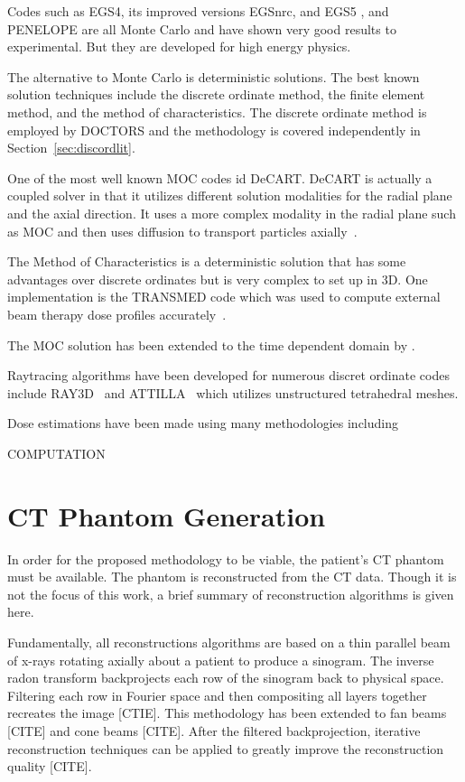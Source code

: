 Codes such as EGS4, its improved versions EGSnrc, and EGS5 \citep{ref:nelsonw}, and PENELOPE \citep{ref:salvatf} are all Monte Carlo and have shown very good results to experimental. But they are developed for high energy physics.

The alternative to Monte Carlo is deterministic solutions. The best known solution techniques include the discrete ordinate method, the finite element method, and the method of characteristics. The discrete ordinate method is employed by DOCTORS and the methodology is covered independently in Section~\ref{sec:discordlit}.

One of the most well known MOC codes id DeCART. DeCART is actually a coupled solver in that it utilizes different solution modalities for the radial plane and the axial direction. It uses a more complex modality in the radial plane such as MOC and then uses diffusion to transport particles axially~\citep{ref:hursinm}.

The Method of Characteristics is a deterministic solution that has some advantages over discrete ordinates but is very complex to set up in 3D. One implementation is the TRANSMED code which was used to compute external beam therapy dose profiles accurately~\citep{ref:williamsm}.

The MOC solution has been extended to the time dependent domain by \citet{ref:hoffmana}.

Raytracing algorithms have been developed for numerous discret ordinate codes include RAY3D~\citep{ref:yingz} and ATTILLA~\citep{ref:wareingt} which utilizes unstructured tetrahedral meshes.



Dose estimations have been made using many methodologies including 

COMPUTATION

\section{CT Phantom Generation}

In order for the proposed methodology to be viable, the patient's CT phantom must be available. The phantom is reconstructed from the CT data. Though it is not the focus of this work, a brief summary of reconstruction algorithms is given here.

Fundamentally, all reconstructions algorithms are based on a thin parallel beam of x-rays rotating axially about a patient to produce a sinogram. The inverse radon transform backprojects each row of the sinogram back to physical space. Filtering each row in Fourier space and then compositing all layers together recreates the image [CTIE]. This methodology has been extended to fan beams [CITE] and cone beams [CITE]. After the filtered backprojection, iterative reconstruction techniques can be applied to greatly improve the reconstruction quality [CITE].

